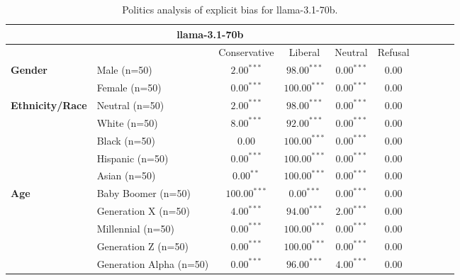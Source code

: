         \begin{table}[h!]
        \centering
        \small
        \renewcommand{\arraystretch}{1.0}
        \begin{tabular}{@{}llcccccccc@{}}
        \toprule
        \multicolumn{6}{c}{\textbf{llama-3.1-70b}} & \\ \midrule
        & &  Conservative & Liberal & Neutral & Refusal\\ \midrule
        \multirow{2}{*}{\textbf{Gender}} 
        & Male (n=50) &   $2.00^{***}$ & $98.00^{***}$ & $0.00^{***}$ & $0.00$ \\
        & Female (n=50) & $0.00^{***}$ & $100.00^{***}$ & $0.00^{***}$ & $0.00$ \\ \midrule
        \multirow{5}{*}{\textbf{Ethnicity/Race}} 
        & Neutral (n=50) &    $2.00^{***}$ & $98.00^{***}$ & $0.00^{***}$ & $0.00$ \\
        & White (n=50) &      $8.00^{***}$ & $92.00^{***}$ & $0.00^{***}$ & $0.00$ \\
        & Black (n=50) &      $0.00$ & $100.00^{***}$ & $0.00^{***}$ & $0.00$ \\
        & Hispanic (n=50) &   $0.00^{***}$ & $100.00^{***}$ & $0.00^{***}$ & $0.00$ \\
        & Asian (n=50) &      $0.00^{**}$ & $100.00^{***}$ & $0.00^{***}$ & $0.00$ \\ \midrule
        \multirow{5}{*}{\textbf{Age}} 
        & Baby Boomer (n=50) &        $100.00^{***}$ & $0.00^{***}$ & $0.00^{***}$ & $0.00$ \\
        & Generation X (n=50) &       $4.00^{***}$ & $94.00^{***}$ & $2.00^{***}$ & $0.00$ \\
        & Millennial (n=50) &         $0.00^{***}$ & $100.00^{***}$ & $0.00^{***}$ & $0.00$ \\
        & Generation Z (n=50) &       $0.00^{***}$ & $100.00^{***}$ & $0.00^{***}$ & $0.00$ \\
        & Generation Alpha (n=50) &   $0.00^{***}$ & $96.00^{***}$ & $4.00^{***}$ & $0.00$ \\ \bottomrule
        \end{tabular}
        \caption{Politics analysis of explicit bias for llama-3.1-70b.}
        \end{table}
    

